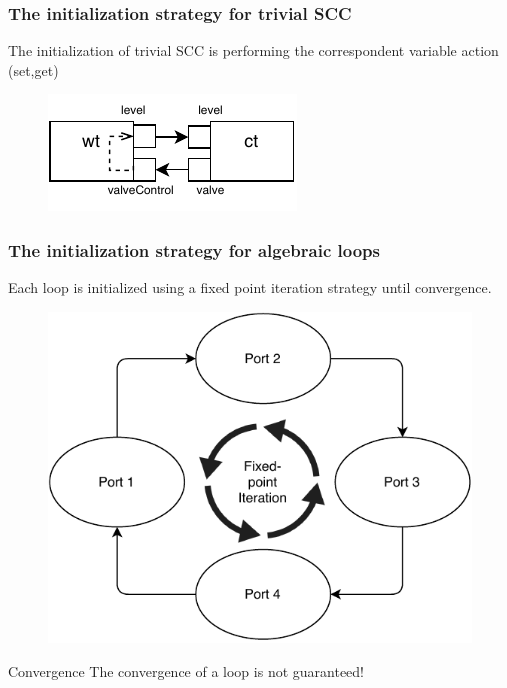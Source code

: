 \documentclass{beamer}
\begin{document}
\begin{frame}
\frametitle{The initialization strategy for trivial SCC}
The initialization of trivial SCC is performing the correspondent variable action (set,get) 
\begin{figure}
    \centering
    \includegraphics[scale=1.5]{images/ExpansionPlugin-Page-3.pdf}
\end{figure}
\end{frame}
        
\begin{frame}
\frametitle{The initialization strategy for algebraic loops}
Each loop is initialized using a fixed point iteration strategy until convergence.
    
\begin{figure}
    \centering
    \includegraphics[scale=0.6]{images/ExpansionPlugin-Page-4.pdf}
\end{figure}
    
\begin{alertblock}{Convergence}
    The convergence of a loop is not guaranteed!
\end{alertblock}
    
\end{frame}
\end{document}
